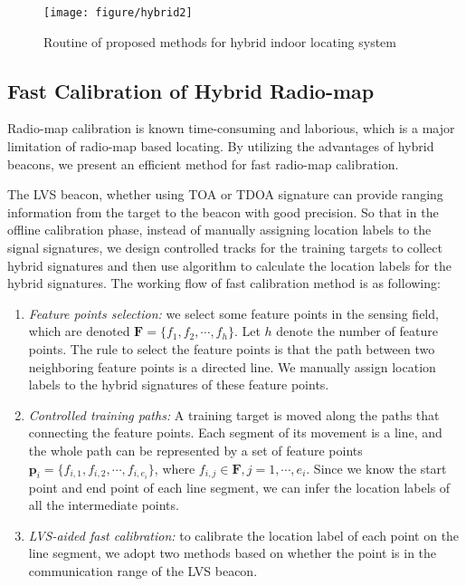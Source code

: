 \documentclass[conference, 10pt]{IEEEtran}
\begin{document}
\begin{figure}[t]
\begin{center}
\texttt{[image: figure/hybrid2]}
\caption{Routine of proposed methods for hybrid indoor locating system}
\label{fig2}
\end{center}
\end{figure}
\subsection{Fast Calibration of Hybrid Radio-map}
Radio-map calibration is known time-consuming and laborious, which is a major limitation of radio-map based locating.  By utilizing the advantages of hybrid beacons, we present an efficient method for fast radio-map calibration. 

The LVS beacon, whether using TOA or TDOA signature can provide ranging information from the target to the beacon with good precision. So that in the offline calibration phase, instead of manually assigning location labels to the signal signatures, we design controlled tracks for the training targets to collect hybrid signatures and then use algorithm to calculate the location labels for the hybrid signatures.  The working flow of fast calibration method is as following:
 \begin{enumerate}
\item \emph{Feature points selection:} we select some feature points in the sensing field, which are denoted $\mathbf{F}=\{f_{1}, f_{2}, \cdots, f_{h}\}$. Let $h$ denote the number of feature points. The rule to select the feature points is that the path between two neighboring feature points is a directed line. We manually assign location labels to the hybrid signatures of these feature points.    
\item \emph{Controlled training paths:} A training target is moved along the paths that connecting the feature points. Each segment of its movement is a line, and the whole path can be represented by a set of feature points $\mathbf{p}_{i}=\{f_{i,1},f_{i,2},\cdots, f_{i,e_{i}}\}$, where $f_{i,j}\in \mathbf{F}, j=1, \cdots, e_{i}$. Since we know the start point and end point of each line segment, we can infer the location labels of all the intermediate points.  
\item \emph{LVS-aided fast calibration: } to calibrate the location label of each point on the line segment, we adopt two methods based on whether the point is in the communication range of the LVS beacon.  
\end{enumerate}
\end{document}
